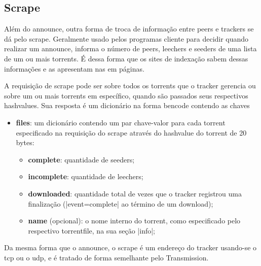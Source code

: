 
\subsection*{Scrape}

Além do \gls*{announce}, outra forma de troca de informação entre \glspl*{peer} e
\glspl*{tracker} se dá pelo \gls{scrape}. Geralmente usado pelos programas cliente para
decidir quando realizar um \gls*{announce}, informa o número de \glspl*{peer},
\glspl*{leecher} e \glspl*{seeder} de uma lista de um ou mais \glspl*{torrent}. É dessa
forma que os sites de indexação sabem dessas informações e as apresentam nas em páginas.

A requisição de \gls*{scrape} pode ser sobre todos os \glspl*{torrent} que o
\gls*{tracker} gerencia ou sobre um ou mais \glspl*{torrent} em específico, quando são
passados seus respectivos \glspl*{hashvalue}. Sua resposta é um dicionário na forma
\gls*{bencode} contendo as chaves

\begin{itemize}
    \item \textbf{files}: um dicionário contendo um par chave-valor para cada
    \gls*{torrent} especificado na requisição do \gls*{scrape} através do
    \gls*{hashvalue} do \gls*{torrent} de 20 bytes:

    \begin{itemize}
        \item \textbf{complete}: quantidade de \glspl*{seeder};

        \item \textbf{incomplete}: quantidade de \glspl*{leecher};

        \item \textbf{downloaded}: quantidade total de vezes que o \gls*{tracker}
        registrou uma finalização (\sverb|event=complete| ao término de um download);

        \item \textbf{name} (opcional): o nome interno do \gls*{torrent}, como
        especificado pelo respectivo \gls*{torrentfile}, na sua seção \bverb|info|;
    \end{itemize}
\end{itemize}

Da mesma forma que o \gls*{announce}, o \gls*{scrape} é um endereço do \gls*{tracker}
usando-se o \gls*{tcp} ou o \gls*{udp}, e é tratado de forma semelhante pelo
Transmission.


